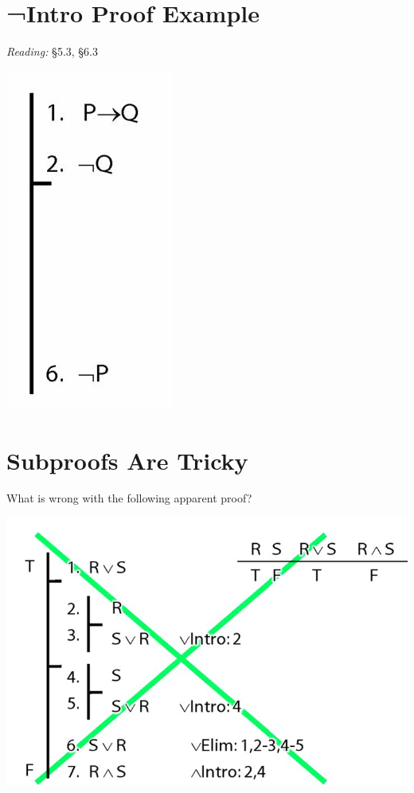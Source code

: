 \documentclass[12pt]{extarticle}
\begin{document}
\begin{multicols*}{3}
 
\section{¬Intro Proof Example}
 
\emph{Reading:} §5.3, §6.3
 
\begin{center}
\includegraphics[scale=0.3]{img/unit_283_proof.png}
\end{center}
 
\columnbreak 
\section{Subproofs Are Tricky}
 
What is wrong with the following apparent proof?
 
\begin{center}
\includegraphics[scale=0.3]{img/unit_224_subproofs_tricky.png}
\end{center}
 

\end{multicols*}
\end{document}
